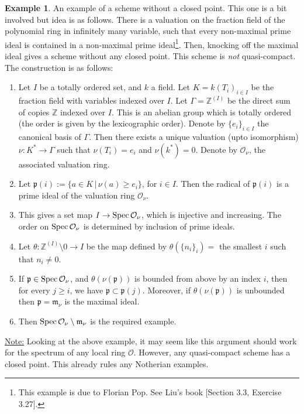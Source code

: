 \documentclass[11pt]{amsart}
\newcommand{\Spec}{{\rm Spec \,}}
\newcommand{\sO}{{\mathcal O}}
\newcommand{\Z}{{\mathbb Z}}
\theoremstyle{definition}
\newtheorem{example}[theorem]{Example}
\begin{document}
\begin{example}
	An example of a scheme without a closed point. This one is a bit involved but idea is as follows. There is a valuation on the fraction field of the polynomial ring in infinitely many variable, such that every non-maximal prime ideal is contained in a non-maximal prime ideal\footnote{This example is due to Florian Pop. See Liu's book [Section 3.3, Exercise 3.27].}. Then, knocking off the maximal ideal gives a scheme without any closed point. This scheme is \textit{not} quasi-compact. The construction is as follows:
\begin{enumerate}
	\item Let $I$ be a totally ordered set, and $k$ a field. Let $K=k(T_i)_{i\in I}$ be the fraction field with variables indexed over $I$. Let $\Gamma = \Z^{(I)}$ be the direct sum of copies $\Z$ indexed over $I$. This is an abelian group which is totally ordered (the order is given by the lexicographic order). Denote by $\lbrace e_i \rbrace_{i\in I}$ the canonical basis of $\Gamma$. Then there exists a unique valuation (upto isomorphism) $\nu : K^*\rightarrow \Gamma$ such that $\nu(T_i)=e_i$ and $\nu(k^*)=0$. Denote by $\sO_{\nu}$, the associated valuation ring.
	\item Let $\mathfrak{p}(i):=\lbrace a\in K \,|\, \nu (a)\geq e_i \rbrace$, for $i\in I$. Then the radical of $\mathfrak{p}(i)$ is a prime ideal of the valuation ring $\sO_{\nu}$.
	\item This gives a set map $I \rightarrow \Spec\sO_{\nu}$, which is injective and increasing. The order on $\Spec\sO_{\nu}$ is determined by inclusion of prime ideals.
	\item Let $\theta:\Z^{(I)}\setminus 0\rightarrow I$ be the map defined by  $\theta(\lbrace n_i\rbrace_i)=$ the smallest $i$ such that $n_i\neq 0$.
	\item If $\mathfrak{p}\in \Spec\sO_{\nu}$, and $\theta(\nu(\mathfrak{p}))$ is bounded from above by an index $i$, then for every $j\geq i$, we have $\mathfrak{p}\subset \mathfrak{p}(j)$. Moreover, if $\theta(\nu(\mathfrak{p}))$ is unbounded then $\mathfrak{p}=\mathfrak{m}_{\nu}$ is the maximal ideal.
	\item Then $\Spec\sO_{\nu}\setminus \mathfrak{m}_{\nu}$ is the required example.
\end{enumerate}
	
\end{example}

\underline{Note:} Looking at the above example, it may seem like this argument should work for the spectrum of any local ring $\sO$. However, any quasi-compact scheme has a closed point. This already rules any Notherian examples.
\end{document}
